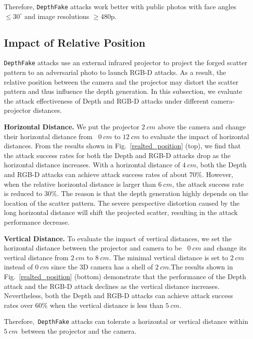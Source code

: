 Therefore, \texttt{DepthFake} attacks work better with  public photos with face angles $\leq 30^\circ$ and image resolutions $\geq$480p.


\subsection{Impact of Relative Position}

\texttt{DepthFake} attacks use an external infrared projector to project the forged scatter pattern to an adversarial photo to launch RGB-D attacks. As a result, the relative position between the camera and the projector may distort the scatter pattern and thus influence the depth generation. In this subsection, we evaluate the attack effectiveness of Depth and RGB-D attacks under different camera-projector distances.

\textbf{Horizontal Distance.} We put the projector $2~cm$ above the camera and change their horizontal distance from  $0~cm$ to $12~cm$ to evaluate the impact of horizontal distances. From the results shown in Fig.~\ref{realted_position} (top), we find that the attack success rates for both the Depth and RGB-D attacks drop as the horizontal distance increases. 
With a horizontal distance of $4~cm$, both the Depth  and RGB-D attacks can achieve attack success rates of about $70\%$. However, when the relative horizontal distance is larger than $6~cm$, the attack success rate is reduced to $30\%$. The reason is that the depth generation highly depends on the location of the scatter pattern. The severe perspective distortion caused by the long horizontal distance will shift the projected scatter, resulting in the attack performance decrease. 

\textbf{Vertical Distance.} To evaluate the impact of vertical distances, we set the horizontal distance between the projector and camera to be  $0~cm$ and change its vertical distance from $2~cm$ to $8~cm$. The minimal vertical distance is set to $2~cm$ instead of $0~cm$ since the 3D camera has a shell of $2~cm$.The results shown in Fig.~\ref{realted_position} (bottom) demonstrate that the performance of the Depth attack and the RGB-D attack declines as the vertical distance increases. Nevertheless, both the Depth and RGB-D attacks can achieve  attack success rates over  $60\%$ when the vertical distance is less than $5~cm$. 

Therefore, \texttt{DepthFake} attacks can tolerate a horizontal or vertical distance within $5~cm$ between the projector and the camera.



